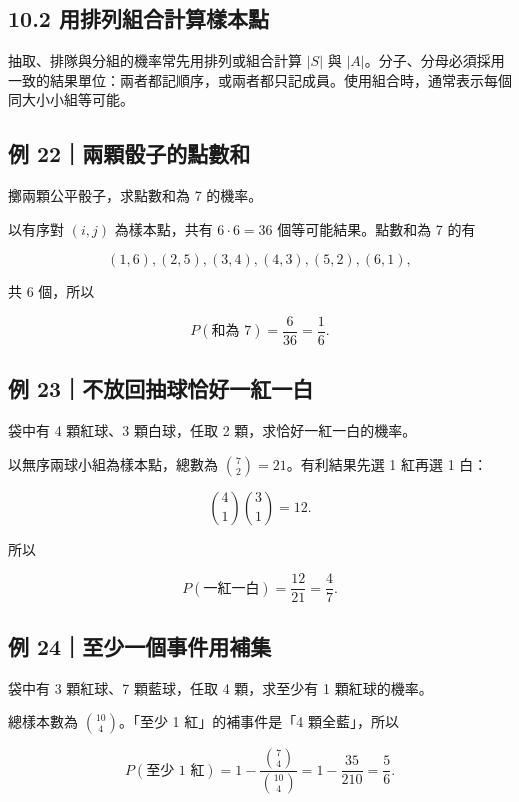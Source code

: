 \documentclass[11pt,a4paper]{article}
\begin{document}
\subsection{10.2 用排列組合計算樣本點}\label{ux7528ux6392ux5217ux7d44ux5408ux8a08ux7b97ux6a23ux672cux9ede}

抽取、排隊與分組的機率常先用排列或組合計算 \(|S|\) 與 \(|A|\)。分子、分母必須採用一致的結果單位：兩者都記順序，或兩者都只記成員。使用組合時，通常表示每個同大小小組等可能。

\subsection{例 22｜兩顆骰子的點數和}\label{ux4f8b-22ux5169ux9846ux9ab0ux5b50ux7684ux9edeux6578ux548c}

擲兩顆公平骰子，求點數和為 7 的機率。

以有序對 \((i,j)\) 為樣本點，共有 \(6\cdot6=36\) 個等可能結果。點數和為 7 的有

\[
(1,6),(2,5),(3,4),(4,3),(5,2),(6,1),
\]

共 6 個，所以

\[
P(\text{和為 }7)=\frac6{36}=\frac16.
\]

\subsection{例 23｜不放回抽球恰好一紅一白}\label{ux4f8b-23ux4e0dux653eux56deux62bdux7403ux6070ux597dux4e00ux7d05ux4e00ux767d}

袋中有 4 顆紅球、3 顆白球，任取 2 顆，求恰好一紅一白的機率。

以無序兩球小組為樣本點，總數為 \(\binom72=21\)。有利結果先選 1 紅再選 1 白：

\[
\binom41\binom31=12.
\]

所以

\[
P(\text{一紅一白})=\frac{12}{21}=\frac47.
\]

\subsection{例 24｜至少一個事件用補集}\label{ux4f8b-24ux81f3ux5c11ux4e00ux500bux4e8bux4ef6ux7528ux88dcux96c6}

袋中有 3 顆紅球、7 顆藍球，任取 4 顆，求至少有 1 顆紅球的機率。

總樣本數為 \(\binom{10}{4}\)。「至少 1 紅」的補事件是「4 顆全藍」，所以

\[
P(\text{至少 1 紅})
=1-\frac{\binom74}{\binom{10}{4}}
=1-\frac{35}{210}
=\frac56.
\]
\end{document}
